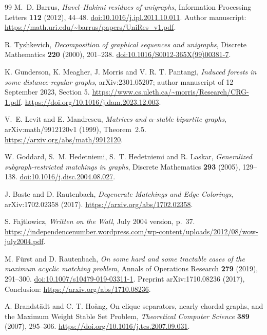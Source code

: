 \documentclass[11pt,a4paper]{article}
\theoremstyle{definition}\newtheorem{definition}[theorem]{Definition}
\theoremstyle{remark}\newtheorem{remark}[theorem]{Remark}
\begin{document}
\begin{thebibliography}{99}
M.~D. Barrus,
\emph{Havel--Hakimi residues of unigraphs},
Information Processing Letters \textbf{112} (2012), 44--48.
\href{https://doi.org/10.1016/j.ipl.2011.10.011}{doi:10.1016/j.ipl.2011.10.011}.
Author manuscript:
\url{https://math.uri.edu/~barrus/papers/UniRes_v1.pdf}.

R. Tyshkevich,
\emph{Decomposition of graphical sequences and unigraphs},
Discrete Mathematics \textbf{220} (2000), 201--238.
\href{https://doi.org/10.1016/S0012-365X(99)00381-7}{doi:10.1016/S0012-365X(99)00381-7}.

K. Gunderson, K. Meagher, J. Morris and V. R. T. Pantangi,
\emph{Induced forests in some distance-regular graphs},
arXiv:2301.05207; author manuscript of 12 September 2023, Section 5.
\url{https://www.cs.uleth.ca/~morris/Research/CRG-1.pdf}.
\url{https://doi.org/10.1016/j.dam.2023.12.003}.

V.~E. Levit and E. Mandrescu,
\emph{Matrices and $\alpha$-stable bipartite graphs},
arXiv:math/9912120v1 (1999), Theorem~2.5.
\url{https://arxiv.org/abs/math/9912120}.

W. Goddard, S.~M. Hedetniemi, S.~T. Hedetniemi and R. Laskar,
\emph{Generalized subgraph-restricted matchings in graphs},
Discrete Mathematics \textbf{293} (2005), 129--138.
\href{https://doi.org/10.1016/j.disc.2004.08.027}{doi:10.1016/j.disc.2004.08.027}.

J. Baste and D. Rautenbach,
\emph{Degenerate Matchings and Edge Colorings},
arXiv:1702.02358 (2017).
\url{https://arxiv.org/abs/1702.02358}.

S. Fajtlowicz, \emph{Written on the Wall}, July 2004 version, p.~37.
\url{https://independencenumber.wordpress.com/wp-content/uploads/2012/08/wow-july2004.pdf}.

M. F\"urst and D. Rautenbach,
\emph{On some hard and some tractable cases of the maximum acyclic
matching problem}, Annals of Operations Research \textbf{279} (2019),
291--300.
\href{https://doi.org/10.1007/s10479-019-03311-1}{doi:10.1007/s10479-019-03311-1}.
Preprint arXiv:1710.08236 (2017), Conclusion:
\url{https://arxiv.org/abs/1710.08236}.

A. Brandst\"adt and C. T. Ho\`ang,
On clique separators, nearly chordal graphs, and the Maximum Weight Stable
Set Problem, \emph{Theoretical Computer Science} \textbf{389} (2007),
295--306. \url{https://doi.org/10.1016/j.tcs.2007.09.031}.


\end{thebibliography}
\end{document}
